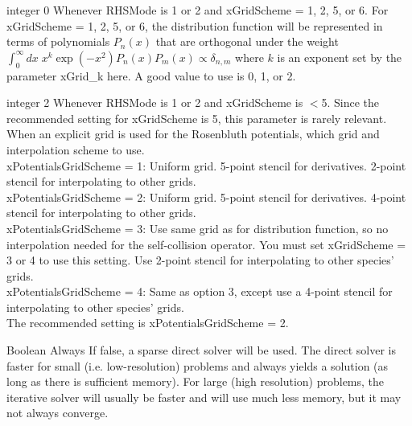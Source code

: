 \myhrule

{integer}
{0}
{Whenever {\ttfamily RHSMode} is 1 or 2 and {\ttfamily xGridScheme} = 1, 2, 5, or 6.}
{For {\ttfamily xGridScheme} = 1, 2, 5, or 6, the distribution function will be represented in terms of polynomials $P_n(x)$
that are orthogonal under the weight $\int_0^\infty dx\; x^k \exp(-x^2) P_n(x) P_m(x)  \propto  \delta_{n,m}$
where $k$ is an exponent set by the parameter {\ttfamily xGrid\_k} here.
A good value to use is 0, 1, or 2.}

\myhrule

{integer}
{2}
{Whenever {\ttfamily RHSMode} is 1 or 2 and {\ttfamily xGridScheme} is $<$5.
Since the recommended setting for {\ttfamily xGridScheme} is 5, this parameter is rarely relevant.}
{When an explicit grid is used for the Rosenbluth potentials, which grid and interpolation scheme to use.\\

{\ttfamily xPotentialsGridScheme} = 1: Uniform grid. 5-point stencil for derivatives. 2-point stencil for interpolating to other grids.\\

{\ttfamily xPotentialsGridScheme} = 2: Uniform grid. 5-point stencil for derivatives. 4-point stencil for interpolating to other grids.\\

{\ttfamily xPotentialsGridScheme} = 3: Use same grid as for distribution function, so no interpolation needed for the self-collision operator.
  You must set {\ttfamily xGridScheme} = 3 or 4 to use this setting.  Use 2-point stencil for interpolating to other species' grids.\\

{\ttfamily xPotentialsGridScheme} = 4: Same as option 3, except use a 4-point stencil for interpolating to other species' grids.\\

The recommended setting is {\ttfamily xPotentialsGridScheme} = 2.}

\myhrule

{Boolean}
{\true}
{Always}
{If false, a sparse direct solver
will be used. The direct solver is faster for small (i.e. low-resolution) problems and always yields a solution
(as long as there is sufficient memory).
For large (high resolution) problems, the iterative solver will usually be faster and will use much
 less memory, but it may not always converge.
}

